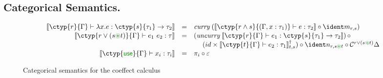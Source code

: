 
\vspace{-1.5em}
\subsection{Categorical Semantics. }
\label{sec:comonads-semantics}

\newcommand{\llangle}{\langle\hspace{-0.25em}\langle}
\newcommand{\rrangle}{\rangle\hspace{-0.25em}\rangle}

\begin{figure*}[t]
\vspace{-1em}
\newcommand{\uu}[1]{\overline{#1}}
\begin{equation*}
\begin{array}{rcll}
\sem{\ctyp{r}{\Gamma} \vdash \lambda x.e : \ctyp{s}{\tau_1} \rightarrow \tau_2} &=& 
    \emph{curry} \; (\sem{\ctyp{r \wedge s}{(\Gamma, x:\tau_1)} \vdash e : \tau_2} \circ \cmerge_{r, s})    %
\\[0.1em]
\sem{\ctyp{r \vee (s \cseq t)}{\Gamma} \vdash e_1~e_2 : \tau} &=& 
    (\emph{uncurry} \;  \sem{\ctyp{r}{\Gamma} \vdash e_1 : \ctyp{s}{\tau_1} \rightarrow \tau_2}) \, \circ \\
 & & \quad\; (id \times \cobind{\sem{\ctyp{t}{\Gamma}\vdash e_2 : \tau_1}}{t,s})
    \circ \csplit_{r, s \cseq t} \circ \ccat^{r \vee (s \cseq t)}\Delta
\\[0.1em]
\sem{\ctyp{\cunit}{\Gamma} \vdash x_i : \tau_i} &=&
    \pi_i \circ \counit                                                                  %
\end{array}
\end{equation*}
\vspace{-1.5em}
\caption{Categorical semantics for the coeffect calculus}
\label{fig:semantics}
\vspace{-1.0em}
\end{figure*}

